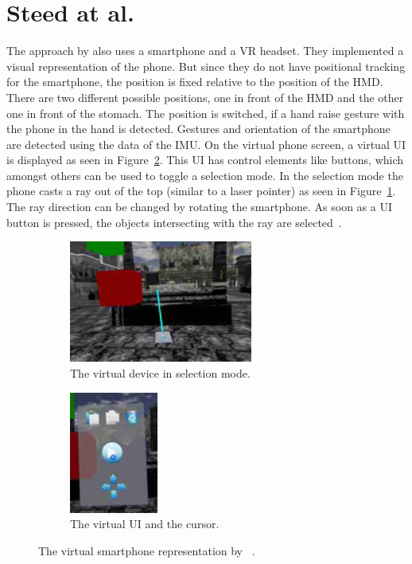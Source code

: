 \section{Steed at al.}\label{section:steed-2013}
The approach by \citeauthor{Steed.2013} also uses a smartphone and a \ac{VR} headset. They implemented a visual representation of the phone. But since they do not have positional tracking for the smartphone, the position is fixed relative to the position of the \ac{HMD}. There are two different possible positions, one in front of the \ac{HMD} and the other one in front of the stomach. The position is switched, if a hand raise gesture with the phone in the hand is detected. Gestures and orientation of the smartphone are detected using the data of the \ac{IMU}. On the virtual phone screen, a virtual \ac{UI} is displayed as seen in Figure~\ref{fig:steed-2013-ui}. This \ac{UI} has control elements like buttons, which amongst others can be used to toggle a selection mode. In the selection mode the phone casts a ray out of the top (similar to a laser pointer) as seen in Figure~\ref{fig:steed-2013-laser-pointer}. The ray direction can be changed by rotating the smartphone. As soon as a \ac{UI} button is pressed, the objects intersecting with the ray are selected~\cite{Steed.2013}.

\begin{figure}[H]
  \centering
  \begin{subfigure}{0.45\textwidth}%
    \centering%
    \includegraphics[height=4cm]{figures/steed_2013_laser_pointer.png}
    \caption{The virtual device in selection mode.}\label{fig:steed-2013-laser-pointer}%
  \end{subfigure}%
  \hspace{0.1\textwidth}%
  \begin{subfigure}{0.45\textwidth}%
    \centering%
    \includegraphics[height=4cm]{figures/steed_2013_ui.png}
    \caption{The virtual \ac{UI} and the cursor.}\label{fig:steed-2013-ui}
  \end{subfigure}%
  \caption[Virtual smartphone representation by Steep et al.]{The virtual smartphone representation by \citeauthor{Steed.2013}~\protect\cite[43]{Steed.2013}.}\label{fig:steed-2013}
\end{figure}